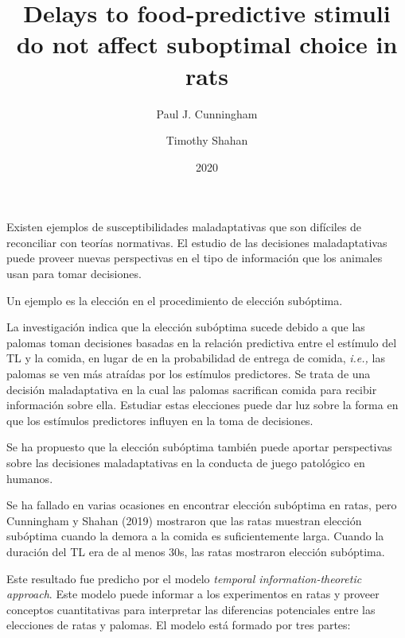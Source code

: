 \documentclass[a4paper,12pt]{article}
\title{Delays to food-predictive stimuli do not affect suboptimal choice in rats}
\author{Paul J. Cunningham \and Timothy Shahan}
\date{2020}
\begin{document}
{\scshape\bfseries \maketitle}

Existen ejemplos de susceptibilidades maladaptativas que son difíciles de reconciliar con teorías normativas. El estudio de las decisiones maladaptativas puede proveer nuevas perspectivas en el tipo de información que los animales usan para tomar decisiones.

Un ejemplo es la elección en el procedimiento de elección subóptima.

La investigación indica que la elección subóptima sucede debido a que las palomas toman decisiones basadas en la relación predictiva entre el estímulo del TL y la comida, en lugar de en la probabilidad de entrega de comida, {\itshape i.e.,} las palomas se ven más atraídas por los estímulos predictores. Se trata de una decisión maladaptativa en la cual las palomas sacrifican comida para recibir información sobre ella. Estudiar estas elecciones puede dar luz sobre la forma en que los estímulos predictores influyen en la toma de decisiones.

Se ha propuesto que la elección subóptima también puede aportar perspectivas sobre las decisiones maladaptativas en la conducta de juego patológico en humanos.

Se ha fallado en varias ocasiones en encontrar elección subóptima en ratas, pero Cunningham y Shahan (2019) mostraron que las ratas muestran elección subóptima cuando la demora a la comida es suficientemente larga. Cuando la duración del TL era de al menos 30s, las ratas mostraron elección subóptima.

Este resultado fue predicho por el modelo {\itshape temporal information-theoretic approach}. Este modelo puede informar a los experimentos en ratas y proveer conceptos cuantitativas para interpretar las diferencias potenciales entre las elecciones de ratas y palomas. El modelo está formado por tres partes:
\end{document}
